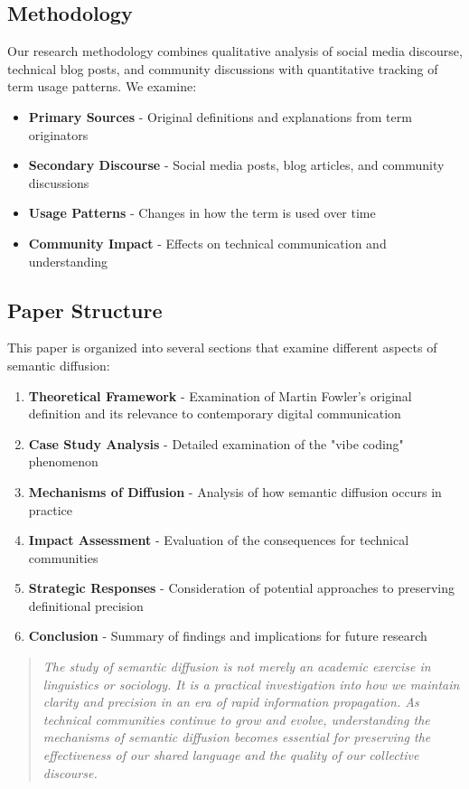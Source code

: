 \documentclass[11pt]{article}
\begin{document}
\subsection{Methodology}

Our research methodology combines qualitative analysis of social media discourse, technical blog posts, and community discussions with quantitative tracking of term usage patterns. We examine:

\begin{itemize}
\item \textbf{Primary Sources} - Original definitions and explanations from term originators
\item \textbf{Secondary Discourse} - Social media posts, blog articles, and community discussions
\item \textbf{Usage Patterns} - Changes in how the term is used over time
\item \textbf{Community Impact} - Effects on technical communication and understanding
\end{itemize}

\subsection{Paper Structure}

This paper is organized into several sections that examine different aspects of semantic diffusion:

\begin{enumerate}
\item \textbf{Theoretical Framework} - Examination of Martin Fowler's original definition and its relevance to contemporary digital communication
\item \textbf{Case Study Analysis} - Detailed examination of the "vibe coding" phenomenon
\item \textbf{Mechanisms of Diffusion} - Analysis of how semantic diffusion occurs in practice
\item \textbf{Impact Assessment} - Evaluation of the consequences for technical communities
\item \textbf{Strategic Responses} - Consideration of potential approaches to preserving definitional precision
\item \textbf{Conclusion} - Summary of findings and implications for future research
\end{enumerate}

\begin{quote}
\emph{The study of semantic diffusion is not merely an academic exercise in linguistics or sociology. It is a practical investigation into how we maintain clarity and precision in an era of rapid information propagation. As technical communities continue to grow and evolve, understanding the mechanisms of semantic diffusion becomes essential for preserving the effectiveness of our shared language and the quality of our collective discourse.}
\end{quote}
\end{document}
